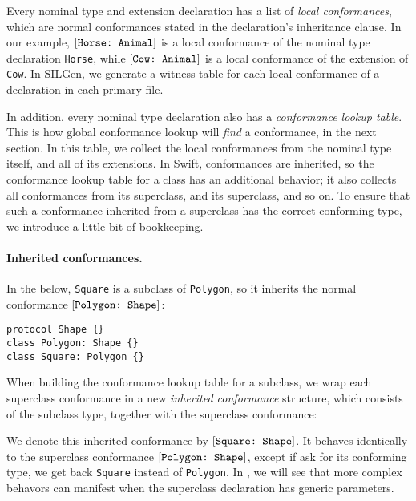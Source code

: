 \documentclass[../generics]{subfiles}
\begin{document}
Every nominal type and extension declaration has a list of \emph{local conformances}, which are normal conformances stated in the declaration's inheritance clause. In our example, $[\texttt{Horse:~Animal}]$ is a local conformance of the nominal type declaration \texttt{Horse}, while $[\texttt{Cow:~Animal}]$ is a local conformance of the extension of \texttt{Cow}. In SILGen, we generate a witness table for each local conformance of a declaration in each primary file.

In addition, every nominal type declaration also has a \emph{conformance lookup table}. This is how global conformance lookup will \emph{find} a conformance, in the next section. In this table, we collect the local conformances from the nominal type itself, and all of its extensions. In Swift, conformances are inherited, so the conformance lookup table for a class has an additional behavior; it also collects all conformances from its superclass, and its superclass, and so on. To ensure that such a conformance inherited from a superclass has the correct conforming type, we introduce a little bit of bookkeeping.

\paragraph{Inherited conformances.}
In the below, \texttt{Square} is a subclass of \texttt{Polygon}, so it inherits the normal conformance $[\texttt{Polygon:~Shape}]$:
\begin{Verbatim}
protocol Shape {}
class Polygon: Shape {}
class Square: Polygon {}
\end{Verbatim}
When building the conformance lookup table for a subclass, we wrap each superclass conformance in a new \emph{inherited conformance} structure, which consists of the subclass type, together with the superclass conformance:
\begin{center}
\end{center}
We denote this inherited conformance by $[\texttt{Square:~Shape}]$. It behaves identically to the superclass conformance $[\texttt{Polygon:~Shape}]$, except if ask for its conforming type, we get back \texttt{Square} instead of \texttt{Polygon}. In , we will see that more complex behavors can manifest when the superclass declaration has generic parameters.
\end{document}
